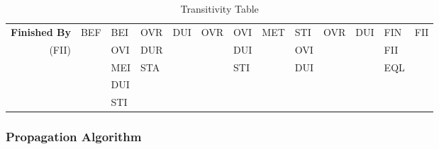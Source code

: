 \documentclass[11pt]{report}
\newenvironment{vvarmargin}[2]
{
  \begin{list}{}
  {
    \setlength{\topsep}{0pt}
    \setlength{\leftmargin}{0pt}
    \setlength{\rightmargin}{0pt}
    \setlength{\listparindent}{\parindent}
    \setlength{\itemindent}{\parindent}
    \setlength{\parsep}{0pt plus 1pt}
    \addtolength{\leftmargin}{#1}\addtolength{\rightmargin}{#2}
  }
  \item
}
{
  \end{list}
}
\begin{document}
\begin{table}[p]
\begin{vvarmargin}{-4cm}{-4cm}
\begin{center}
\begin{tabular}[t]{|r|l|l|l|l|l|l|l|l|l|l|l|l|}
                  \hline
                  \textbf{Finished By}    & BEF                     & BEI                     & OVR                     & DUI                     & OVR                     & OVI                     & MET                     & STI                     & OVR                     & DUI                     & FIN                     & FII                     \\
                  (FII)                   &                         & OVI                     & DUR                     &                         &                         & DUI                     &                         & OVI                     &                         &                         & FII                     &                         \\
                                          &                         & MEI                     & STA                     &                         &                         & STI                     &                         & DUI                     &                         &                         & EQL                     &                         \\
                                          &                         & DUI                     &                         &                         &                         &                         &                         &                         &                         &                         &                         &                         \\
                                          &                         & STI                     &                         &                         &                         &                         &                         &                         &                         &                         &                         &                         \\
                  \hline
                \end{tabular}
              \end{center}
              \caption{Transitivity Table}
              \label{tabl-tempo-ttabl}
            \end{vvarmargin}
          \end{table}

        \subsubsection{Propagation Algorithm}
\end{document}
